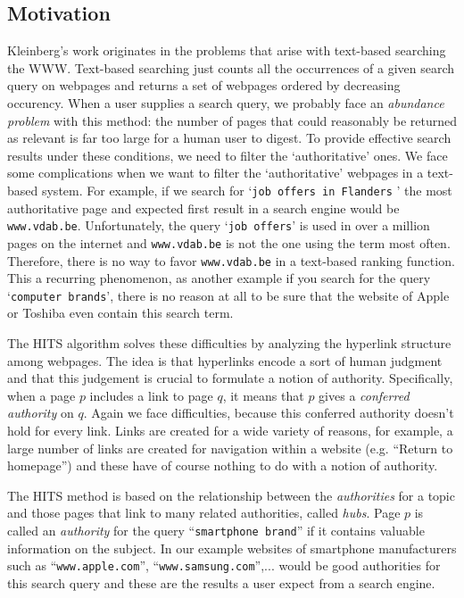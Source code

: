 \documentclass[a4paper,11pt]{report}
\begin{document}
\subsection{Motivation}\label{motivatiehits}
Kleinberg's work originates in the problems that arise with text-based searching the WWW. Text-based searching just counts all the occurrences of a given search query on webpages and returns a set of webpages ordered by decreasing occurency.
When a user 
supplies a search query, we probably face an \textit{abundance problem} with this method: the number of pages that could reasonably be returned as relevant is
far too large for a human user to digest. To provide effective search results 
under these conditions, we need to filter the `authoritative' ones. We face some complications when we
want to filter the `authoritative' webpages in a text-based system. For example, if we search for `\texttt{job offers in Flanders} 
' the most authoritative page and expected first result in a search engine would be \texttt{www.vdab.be}. 
Unfortunately, the query  `\texttt{job offers}' is used in over a 
million pages on the internet and \texttt{www.vdab.be} is not the one using the 
term most often. Therefore, there is no way to favor \texttt{www.vdab.be} in a 
text-based ranking function. This a recurring phenomenon, as another example if 
you search for the query `\texttt{computer brands}', there is no reason at all to be sure that the 
website of Apple or Toshiba even contain this search term.

The HITS algorithm solves these difficulties by analyzing the hyperlink 
structure among webpages. The idea is that hyperlinks encode a sort of human 
judgment and that this judgement is crucial to formulate a notion of authority. 
Specifically, when a page $p$ includes a link to page $q$, it means 
that $p$ gives a \textit{conferred authority} on $q$. Again we face difficulties, because this conferred authority doesn't 
hold for every link. Links are created for a wide variety of reasons, for 
example, a large number of links are created for navigation within a website (e.g. ``Return to homepage'') 
and these have of course nothing to do with a notion of authority. 

The HITS method is based on the relationship between the \textit{authorities} for a topic 
and those pages that link to many related authorities, called \emph{hubs}. Page $p$ 
is called an \textit{authority} for the query ``\texttt{smartphone brand}'' if it 
contains valuable information on the subject. In our example websites of 
smartphone manufacturers such as ``\texttt{www.apple.com}'', 
``\texttt{www.samsung.com}'',... would be good authorities for this search 
query and these are the results a user expect from a search engine. 
\end{document}
